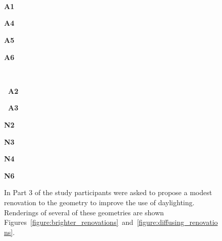 \documentclass[review]{vgtc}                 %
\begin{document}
\begin{figure}[t]
\begin{minipage}[c]{4.9in}
\end{minipage}
\vspace{-1.12in}
\\
\begin{minipage}{1.65in}~\end{minipage}
\begin{minipage}{1.65in}~\end{minipage}
\begin{minipage}{0.9in}{\bf A1}\end{minipage}
\begin{minipage}{0.9in}{\bf A4}\end{minipage}
\begin{minipage}{0.88in}{\bf A5}\end{minipage}
\begin{minipage}{0.88in}{\bf A6}\end{minipage}%
\vspace{0.68in}
\\
\begin{minipage}{1.65in}{\bf ~A2}\end{minipage}
\begin{minipage}{1.65in}{\bf ~A3}\end{minipage}
\begin{minipage}{0.9in}{\bf N2}\end{minipage}
\begin{minipage}{0.9in}{\bf N3}\end{minipage}
\begin{minipage}{0.88in}{\bf N4}\end{minipage}
\begin{minipage}{0.88in}{\bf N6}\end{minipage}\vspace{0.0in}%
  \caption{ In Part 3 of the study participants were asked to propose
    a modest renovation to the geometry to improve the use of
    daylighting.
Renderings of several of these geometries are shown
Figures~\ref{figure:brighter_renovations}~and~\ref{figure:diffusing_renovations}.
  }
\label{figure:improved_designs}
\vspace{-0.1in}
\end{figure}
\end{document}
